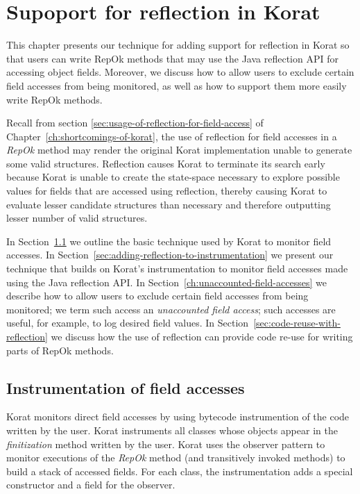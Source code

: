 \chapter{Supoport for reflection in Korat}
\label{ch:adding-reflection}
This chapter presents our technique for adding support for reflection
in Korat so that users can write RepOk methods that may use the Java
reflection API for accessing object fields.  Moreover, we discuss how
to allow users to exclude certain field accesses from being monitored,
as well as how to support them more easily write RepOk methods.

Recall from section \ref{sec:usage-of-reflection-for-field-access} of
Chapter~\ref{ch:shortcomings-of-korat}, the use of reflection for
field accesses in a \emph{RepOk} method may render the original Korat
implementation unable to generate some valid structures.  Reflection
causes Korat to terminate its search early because Korat is unable to
create the state-space necessary to explore possible values for fields
that are accessed using reflection, thereby causing Korat to evaluate
lesser candidate structures than necessary and therefore outputting
lesser number of valid structures.

\para In Section~\ref{sec:instrumentation-of-field-accesses} we
outline the basic technique used by Korat to monitor field accesses.
In Section~\ref{sec:adding-reflection-to-instrumentation} we present
our technique that builds on Korat's instrumentation to monitor field
accesses made using the Java reflection API. In
Section~\ref{ch:unaccounted-field-accesses} we describe how to allow
users to exclude certain field accesses from being monitored; we term
such access an \emph{unaccounted field access}; such accesses are
useful, for example, to log desired field values.  In
Section~\ref{sec:code-reuse-with-reflection} we discuss how the use of
reflection can provide code re-use for writing parts of RepOk methods.

\section{Instrumentation of field accesses}
\label{sec:instrumentation-of-field-accesses}
Korat monitors direct field accesses by using bytecode instrumention
of the code written by the user.  Korat instruments all classes whose
objects appear in the \emph{finitization} method written by the
user. Korat uses the observer pattern \cite{gamma1994design} to
monitor executions of the \emph{RepOk} method (and transitively
invoked methods) to build a stack of accessed fields. For each class,
the instrumentation adds a special constructor and a field for the
observer.

